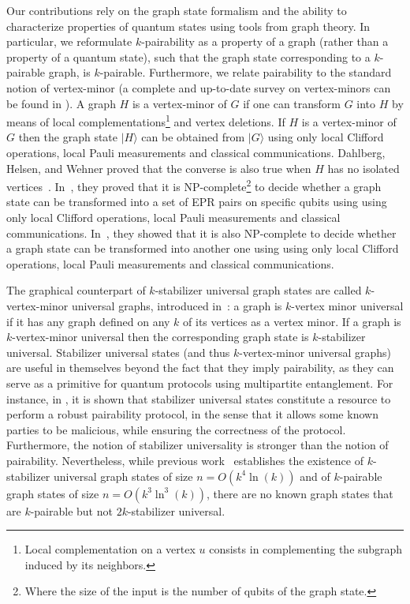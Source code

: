 \documentclass[10pt,a4paper]{article}
\newcommand{\ket}[1]{{\ensuremath{\lvert#1\rangle}}}
\begin{document}
Our contributions rely on the graph state formalism and the ability to characterize properties of quantum states using tools from graph theory. In particular, we reformulate $k$-pairability as a property of a graph (rather than a property of a quantum state), such that the graph state corresponding to a $k$-pairable graph, is $k$-pairable. Furthermore, we relate pairability to the standard notion of vertex-minor (a complete and up-to-date survey on vertex-minors can be found in \cite{kim2023vertex}). A graph $H$ is a vertex-minor of $G$ if one can transform $G$ into $H$ by means of local complementations\footnote{Local complementation on a vertex $u$ consists  in complementing the subgraph induced by its neighbors.} and vertex deletions. If $H$ is a vertex-minor of $G$ then the graph state $\ket{H}$ can be obtained from $\ket G$ using only local Clifford operations, local Pauli measurements and classical communications. Dahlberg, Helsen, and Wehner proved that the converse is also true when $H$ has no isolated vertices~\cite{DWH:transfo}. In~\cite{dahlberg2020transforming}, they proved that it is NP-complete\footnote{Where the size of the input is the number of qubits of the graph state.} to decide whether a graph state can be transformed into a set of EPR pairs on specific qubits using using only local Clifford operations, local Pauli measurements and classical communications. In~\cite{DHW:howtotransform}, they showed that it is also NP-complete to decide whether a graph state can be transformed into another one using using only local Clifford operations, local Pauli measurements and classical communications.

The graphical counterpart of $k$-stabilizer universal graph states are called $k$-vertex-minor universal graphs, introduced in~\cite{claudet2023small}: a graph is $k$-vertex minor universal if it has any graph defined on any $k$ of its vertices as a vertex minor. If a graph is $k$-vertex-minor universal then the corresponding graph state is $k$-stabilizer universal. 
Stabilizer universal states (and thus $k$-vertex-minor universal graphs) are useful in themselves beyond the fact that they imply pairability, as they can serve as a primitive for quantum protocols using multipartite entanglement.  For instance, in \cite{claudet2023small}, it is shown that stabilizer universal states constitute a resource to perform a robust pairability protocol, in the sense that it allows some known parties to be malicious, while ensuring the correctness of the protocol. Furthermore, the notion of stabilizer universality is stronger than the notion of pairability. Nevertheless, while previous work~\cite{claudet2023small} establishes the existence of $k$-stabilizer universal graph states of size $n = O(k^4 \ln(k))$ and  of $k$-pairable graph states of size $n = O(k^3 \ln^3(k))$, there are no known graph states that are $k$-pairable but not $2k$-stabilizer universal.
\end{document}

